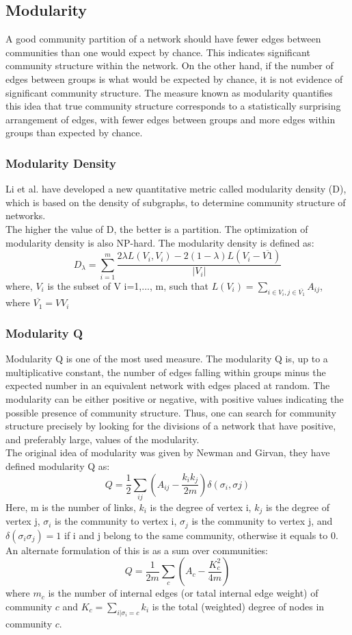 \subsection{Modularity}
A good community partition of a network should have fewer edges between communities than one would expect by chance. This indicates significant community structure within the network. On the other hand, if the number of edges between groups is what would be expected by chance, it is not evidence of significant community structure. The measure known as modularity quantifies this idea that true community structure corresponds to a statistically surprising arrangement of edges, with fewer edges between groups and more edges within groups than expected by chance.\\
\subsubsection{Modularity Density}
Li et al. have developed a new quantitative metric called modularity density (D), which is based on the density of subgraphs, to determine community structure of networks.\\
The higher the value of D, the better is a partition. The optimization of modularity density is also NP-hard. The modularity density is defined as:\\
$$D_\lambda=\sum_{i=1}^{m} \frac{2\lambda L(V_i, V_i)-2(1-\lambda)L(V_i-\overline{V1})}{\vert {V_i}\vert }$$
where, $V_i$  is the subset of V i=1,..., m, such that $L(V_i)=\sum_{i\in V_{i}, j\in \overline{V_1}}A_{ij}$, where  $\overline{V_1}=VV_i$
\subsubsection{Modularity Q}
Modularity Q is one of the most used measure. The modularity Q is, up to a multiplicative constant, the number of edges falling within groups minus the expected number in an equivalent network with edges placed at random.
The modularity can be either positive or negative, with positive values indicating the possible presence of community structure. Thus, one can search for community structure precisely by looking for the divisions of a network that have positive, and preferably large, values of the modularity.\\
The original idea of modularity was given by Newman and Girvan, they have defined modularity Q as:\\
$$Q=\frac{1}{2}\sum_{ij}(A_{ij}-\frac{k_{i}k_{j}}{2m})\delta(\sigma_{i},\sigma{j})$$
Here, m is the number of links, $k_{i}$ is the degree of vertex i, $k_{j}$ is the degree of vertex j, $\sigma_{i}$ is the community to vertex i, $\sigma_{j}$ is the community to vertex j, and $\delta(\sigma_{i}\sigma_{j}) = 1$ if i and j belong to the same community, otherwise it equals to 0.\\
An alternate formulation of this is as a sum over communities:
$$Q=\frac{1}{2m}\sum_{c}(A_{c}-\frac{K_{c}^{2}}{4m})$$
where $m_{c}$ is the number of internal edges (or tatal internal edge weight) of community $c$ and $K_{c} = \sum_{i|\sigma_{i}=c}k_{i}$ is the total (weighted) degree of nodes in community $c$.
